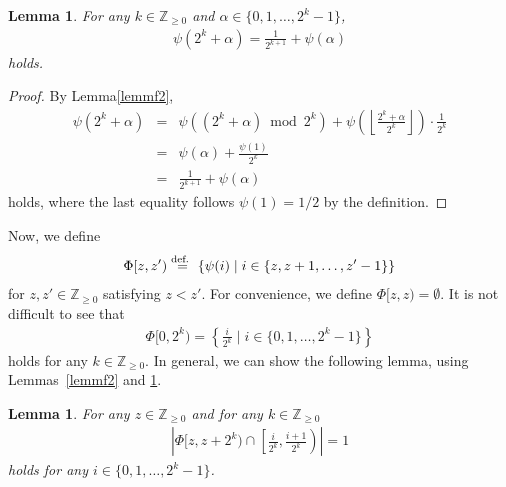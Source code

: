 \documentclass[letter, 11pt]{article}
\newcommand{\defeq}{\stackrel{\mbox{\scriptsize{\normalfont\rmfamily def. }}}{=}}
\newcommand{\1}{\mbox{1}\hspace{-0.25em}\mbox{l}}
\newtheorem{lemma}[theorem]{Lemma}
\begin{document}
\begin{lemma}\label{lemmf1}
 For any $k \in \mathbb{Z}_{\geq 0}$ and $\alpha \in \{0, 1, \ldots, 2^k-1\}$, 
\begin{eqnarray*}
\psi(2^k+\alpha )=\frac{1}{2^{k+1}} +\psi(\alpha )
\end{eqnarray*}
holds. 
\end{lemma}
\begin{proof}
 By Lemma\ref{lemmf2}, 
\begin{eqnarray*}
 \psi(2^k+\alpha )
 &=&  \psi\left( (2^k+\alpha ) \bmod 2^k\right) 
     +\psi\left( \left \lfloor \frac{2^k+\alpha }{2^k}\right \rfloor \right)\cdotp \frac{1}{2^k} \\
 &=& \psi(\alpha )+\frac{\psi(1)}{2^k} \\
 &=& \frac{1}{2^{k+1}} +\psi(\alpha) 
\end{eqnarray*}
  holds, where the last equality follows  $\psi(1)=1/2$ by the definition. 
\end{proof}
Now, we define 
\begin{eqnarray}
 \Phi[z, z') \defeq \{\psi(i)\mid i \in \{ z, z+1, \ldots, z'-1 \} \}
 \label{def:Psi}
\end{eqnarray}
  for $z,z' \in \mathbb{Z}_{\geq 0}$ satisfying $z < z'$. 
 For convenience, we define $\Phi[z, z) = \emptyset$. 
It is not difficult to see that 
\begin{eqnarray}
 \Phi [0, 2^k)=\left \{ \frac{i}{2^{k}}\mid i \in \{0, 1, \ldots, 2^k-1 \} \right \}
\label{eq:coloF}
\end{eqnarray}
 holds for any $k \in \mathbb{Z}_{\geq 0}$. 
In general, we can show the following lemma, using Lemmas~\ref{lemmf2} and \ref{lemmf1}. 
\begin{lemma}\label{lemmfxy2}
For any $z \in \mathbb{Z}_{\geq 0}$ and for any $k \in \mathbb{Z}_{\geq 0}$
\begin{eqnarray*}
\left| \Phi[z, z+2^k)\cap \left[ \frac{i}{2^k}, \frac{i+1}{2^k}\right) \right|=1
\end{eqnarray*}
 holds for any $i\in \{0, 1, \ldots, 2^k-1\}$. 
\end{lemma}
\end{document}
